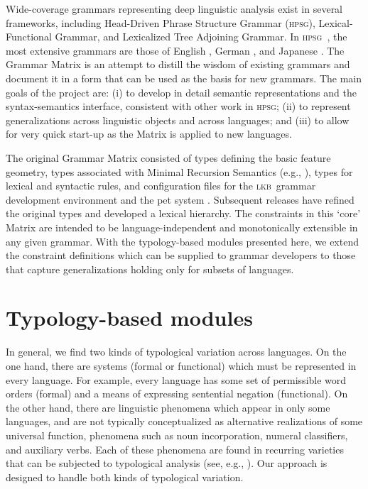 \documentclass[11pt]{article}
\newcommand{\hpsg}{\textsc{hpsg}}
\newcommand{\lkb}{\textsc{lkb}}
\begin{document}
Wide-coverage grammars representing deep linguistic analysis exist in
several frameworks, including Head-Driven Phrase Structure Grammar
(\hpsg), Lexical-Functional Grammar, and Lexicalized Tree Adjoining
Grammar.  In \hpsg\ \cite{Pol:Sag:94}, the most extensive grammars are
those of English \cite{Flickinger:00}, German
\cite{Hinrichs:etal:97,Mue:Kap:00,Crysmannip}, and Japanese
\cite{Siegel:00,Siegel:Bender:02}.  The Grammar Matrix is an attempt
to distill the wisdom of existing grammars and document it in a form
that can be used as the basis for new grammars. The main goals of the
project are: (i) to develop in detail semantic representations and 
the syntax-semantics interface, consistent with other work
in \hpsg; (ii) to represent generalizations across linguistic objects
and across languages; and (iii) to allow for very quick start-up as
the Matrix is applied to new languages.

The original Grammar Matrix consisted of types defining the basic
feature geometry, types associated with Minimal Recursion Semantics
(e.g., \cite{Cop:Las:Fli:01}), types for lexical and syntactic rules,
and configuration files for the \lkb\ grammar development environment
\cite{Copestake:02} and the {\sc pet} system \cite{Callmeier:00}.
Subsequent releases have refined the original types and developed a
lexical hierarchy.  The constraints in this `core' Matrix are intended
to be language-independent and monotonically extensible in any given
grammar.  With the typology-based modules presented here, we extend
the constraint definitions which can be supplied to grammar developers
to those that capture generalizations holding only for subsets of
languages.

\section{Typology-based modules}

In general, we find two kinds of typological variation across
languages.  On the one hand, there are systems (formal or functional)
which must be represented in every language.  For example, every
language has some set of permissible word orders (formal) and a means
of expressing sentential negation (functional).  On the other hand,
there are linguistic phenomena which appear in only some languages,
and are not typically conceptualized as alternative realizations of
some universal function, phenomena such as noun
incorporation, numeral classifiers, and auxiliary verbs. Each of these
phenomena are found in recurring varieties that can be subjected to
typological analysis (see, e.g., \cite{Mithun:84}).  Our approach is
designed to handle both kinds of typological variation.
\end{document}
